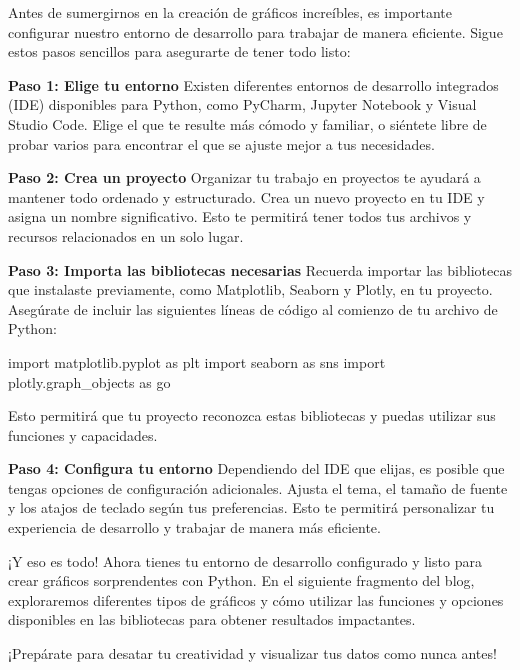 \documentclass[
  a4paper,
]{article}
\newenvironment{Shaded}{}{}
\newcommand{\ImportTok}[1]{\textcolor[rgb]{0.01,0.18,0.38}{#1}}
\newcommand{\NormalTok}[1]{\textcolor[rgb]{0.14,0.16,0.18}{#1}}
\begin{document}
Antes de sumergirnos en la creación de gráficos increíbles, es
importante configurar nuestro entorno de desarrollo para trabajar de
manera eficiente. Sigue estos pasos sencillos para asegurarte de tener
todo listo:

\textbf{Paso 1: Elige tu entorno} Existen diferentes entornos de
desarrollo integrados (IDE) disponibles para Python, como PyCharm,
Jupyter Notebook y Visual Studio Code. Elige el que te resulte más
cómodo y familiar, o siéntete libre de probar varios para encontrar el
que se ajuste mejor a tus necesidades.

\textbf{Paso 2: Crea un proyecto} Organizar tu trabajo en proyectos te
ayudará a mantener todo ordenado y estructurado. Crea un nuevo proyecto
en tu IDE y asigna un nombre significativo. Esto te permitirá tener
todos tus archivos y recursos relacionados en un solo lugar.

\textbf{Paso 3: Importa las bibliotecas necesarias} Recuerda importar
las bibliotecas que instalaste previamente, como Matplotlib, Seaborn y
Plotly, en tu proyecto. Asegúrate de incluir las siguientes líneas de
código al comienzo de tu archivo de Python:

\begin{Shaded}
\begin{Highlighting}[]
\ImportTok{import}\NormalTok{ matplotlib.pyplot }\ImportTok{as}\NormalTok{ plt}
\ImportTok{import}\NormalTok{ seaborn }\ImportTok{as}\NormalTok{ sns}
\ImportTok{import}\NormalTok{ plotly.graph\_objects }\ImportTok{as}\NormalTok{ go}
\end{Highlighting}
\end{Shaded}

Esto permitirá que tu proyecto reconozca estas bibliotecas y puedas
utilizar sus funciones y capacidades.

\textbf{Paso 4: Configura tu entorno} Dependiendo del IDE que elijas, es
posible que tengas opciones de configuración adicionales. Ajusta el
tema, el tamaño de fuente y los atajos de teclado según tus
preferencias. Esto te permitirá personalizar tu experiencia de
desarrollo y trabajar de manera más eficiente.

¡Y eso es todo! Ahora tienes tu entorno de desarrollo configurado y
listo para crear gráficos sorprendentes con Python. En el siguiente
fragmento del blog, exploraremos diferentes tipos de gráficos y cómo
utilizar las funciones y opciones disponibles en las bibliotecas para
obtener resultados impactantes.

¡Prepárate para desatar tu creatividad y visualizar tus datos como nunca
antes!
\end{document}
